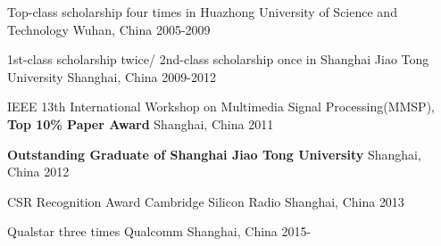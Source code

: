 



\begin{cvhonors}

  \cvhonor
    {} %
    {Top-class scholarship four times in Huazhong University of Science and Technology} %
    {Wuhan, China} %
    {2005-2009} %

  \cvhonor
    {} %
    {1st-class scholarship twice/ 2nd-class scholarship once in Shanghai Jiao Tong University} %
    {Shanghai, China} %
    {2009-2012} %

  \cvhonor
    {} %
    {IEEE 13th International Workshop on Multimedia Signal Processing(MMSP), \textbf{Top 10\% Paper Award}} %
    {Shanghai, China} %
    {2011} %

  \cvhonor
    {} %
    {\textbf{Outstanding Graduate of Shanghai Jiao Tong University}} %
    {Shanghai, China} %
    {2012} %

\end{cvhonors}




\begin{cvhonors}

  \cvhonor
    {CSR Recognition Award} %
    {Cambridge Silicon Radio} %
    {Shanghai, China} %
    {2013} %

  \cvhonor
    {Qualstar three times} %
    {Qualcomm} %
    {Shanghai, China} %
    {2015-} %

\end{cvhonors}
